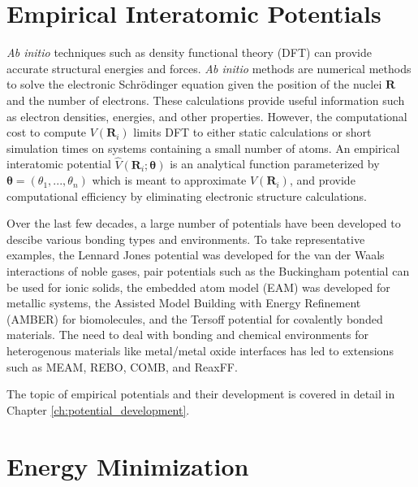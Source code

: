 \section{Empirical Interatomic Potentials}
\emph{Ab initio} techniques such as density functional theory (DFT)\cite{hohenberg1964_dft,kohn1965_dft} can provide accurate structural energies and forces.    \emph{Ab initio} methods are numerical methods to solve the electronic Schr\"odinger equation given the position of the nuclei $\bm{R}$ and the number of electrons.  These calculations provide useful information such as electron densities, energies, and other properties. However, the computational cost to compute $V(\bm{R}_i)$  limits DFT to either static calculations or short simulation times on systems containing a small number of atoms.
An empirical interatomic potential $\hat{V}(\bm{R}_i;\bm{\theta})$ is an analytical function parameterized by $\bm{\theta}=(\theta_1,...,\theta_n)$ which is meant to approximate $V(\bm{R}_i)$, and provide computational efficiency by eliminating electronic structure calculations.

Over the last few decades, a large number of potentials have been developed to descibe various bonding types and environments.
To take representative examples, the Lennard Jones potential\cite{lennardjones1924_lj_pot} was developed for the van der Waals interactions of noble gases, pair potentials such as the Buckingham potential\cite{buckingham1938} can be used for ionic solids\cite{catlow1977_buckingham}, the embedded atom model (EAM)\cite{daw1983_eam,daw1984_eam} was developed for metallic systems,
the Assisted Model Building with Energy Refinement (AMBER)\cite{cornell1995_potential_amber} for biomolecules, and
the Tersoff potential\cite{tersoff1988_potential_1,tersoff1988_potential_2} for covalently bonded materials.
The need to deal with bonding and chemical environments for heterogenous materials like metal/metal oxide interfaces has led to extensions such as MEAM\cite{baskes1992_potential_meam},  REBO\cite{brenner1990_potential_rebo},  COMB\cite{liang2003_potential_comb},
and ReaxFF\cite{vanduin2001_reaxff}.

The topic of empirical potentials and their development is covered in detail in Chapter \ref{ch:potential_development}.

\section{Energy Minimization}

